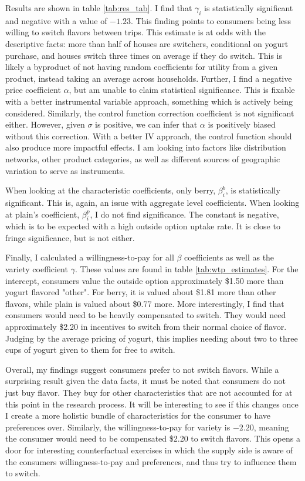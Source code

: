 \documentclass[11pt]{article}
\theoremstyle{definition}
\theoremstyle{remark}
\begin{document}
Results are shown in table \ref{tab:res_tab}. I find that $\gamma_i$ is statistically significant and negative with a value of $-1.23$. This finding points to consumers being less willing to switch flavors between trips. This estimate is at odds with the descriptive facts: more than half of houses are switchers, conditional on yogurt purchase, and houses switch three times on average if they do switch. This is likely a byproduct of not having random coefficients for utility from a given product, instead taking an average across households. Further, I find a negative price coefficient $\alpha$, but am unable to claim statistical significance. This is fixable with a better instrumental variable approach, something which is actively being considered. Similarly, the control function correction coefficient is not significant either. However, given $\sigma$ is positive, we can infer that $\alpha$ is positively biased without this correction. With a better IV approach, the control function should also produce more impactful effects. I am looking into factors like distribution networks, other product categories, as well as different sources of geographic variation to serve as instruments.

When looking at the characteristic coefficients, only berry, $\beta_i^b$, is statistically significant. This is, again, an issue with aggregate level coefficients. When looking at plain's coefficient, $\beta_i^p$, I do not find significance. The constant is negative, which is to be expected with a high outside option uptake rate. It is close to fringe significance, but is not either. 

Finally, I calculated a willingness-to-pay for all $\beta$ coefficients as well as the variety coefficient $\gamma$. These values are found in table \ref{tab:wtp_estimates}. For the intercept, consumers value the outside option approximately \$1.50 more than yogurt flavored "other". For berry, it is valued about \$1.81 more than other flavors, while plain is valued about \$0.77 more. More interestingly, I find that consumers would need to be heavily compensated to switch. They would need approximately \$2.20 in incentives to switch from their normal choice of flavor. Judging by the average pricing of yogurt, this implies needing about two to three cups of yogurt given to them for free to switch. 

Overall, my findings suggest consumers prefer to not switch flavors. While a surprising result given the data facts, it must be noted that consumers do not just buy flavor. They buy for other characteristics that are not accounted for at this point in the research process. It will be interesting to see if this changes once I create a more holistic bundle of characteristics for the consumer to have preferences over. Similarly, the willingness-to-pay for variety is $-2.20$, meaning the consumer would need to be compensated \$2.20 to switch flavors. This opens a door for interesting counterfactual exercises in which the supply side is aware of the consumers willingness-to-pay and preferences, and thus try to influence them to switch. 
\end{document}
